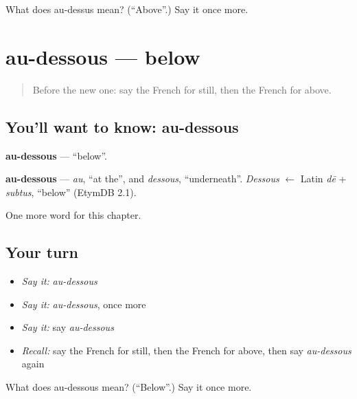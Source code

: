\begin{tcolorbox}[breakable,colback=teal!4,colframe=teal!35!black,title={Before you move on}]
What does au-dessus mean? (\textquotedblleft{}Above\textquotedblright{}.) Say it once more.
\end{tcolorbox}
\section[au-dessous]{au-dessous — below}

\label{lesson:FR-C157-au-dessous}



\begin{quote}
Before the new one: say the French for still, then the French for above.
\end{quote}

\subsection*{You'll want to know: au-dessous}
\textbf{au-dessous} — \textquotedblleft{}below\textquotedblright{}.

\begin{cousinweb}
\textbf{au-dessous} — \emph{au}, \textquotedblleft{}at the\textquotedblright{}, and \emph{dessous}, \textquotedblleft{}underneath\textquotedblright{}. \emph{Dessous} $\leftarrow$ Latin \emph{dē} + \emph{subtus}, \textquotedblleft{}below\textquotedblright{} (EtymDB 2.1).
\end{cousinweb}

\begin{grammarlens}[title={What you've built}]
One more word for this chapter.
\end{grammarlens}

\subsection*{Your turn}
\begin{itemize}
\raggedright
  \item \emph{Say it:} \emph{au-dessous}
  \item \emph{Say it:} \emph{au-dessous}, once more
  \item \emph{Say it:} say \emph{au-dessous}
  \item \emph{Recall:} say the French for still, then the French for above, then say \emph{au-dessous} again
\end{itemize}

\begin{tcolorbox}[breakable,colback=teal!4,colframe=teal!35!black,title={Before you move on}]
What does au-dessous mean? (\textquotedblleft{}Below\textquotedblright{}.) Say it once more.
\end{tcolorbox}
